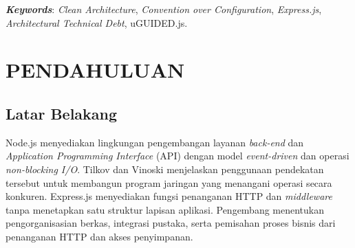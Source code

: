 \documentclass[12pt,a4paper,oneside]{report}
\begin{document}
\vspace{0.4cm}
\noindent\textbf{\textit{Keywords}}: \textit{Clean Architecture}, \textit{Convention over Configuration}, \textit{Express.js}, \textit{Architectural Technical Debt}, uGUIDED.js.

\newpage

{
  \singlespacing
  \setlength{\parskip}{0pt}
  \tableofcontents
}
\newpage

{
  \singlespacing
  \setlength{\parskip}{0pt}
  \listoffigures
}
\newpage

{
  \singlespacing
  \setlength{\parskip}{0pt}
  \listoftables
}
\newpage

\setcounter{page}{1}

\chapter{PENDAHULUAN}
\label{chap:pendahuluan}

\section{Latar Belakang}
\label{sec:latar_belakang}

Node.js menyediakan lingkungan pengembangan layanan \textit{back-end} dan \textit{Application Programming Interface} (API) dengan model \textit{event-driven} dan operasi \textit{non-blocking I/O}. Tilkov dan Vinoski \cite{tilkov2010node} menjelaskan penggunaan pendekatan tersebut untuk membangun program jaringan yang menangani operasi secara konkuren. Express.js menyediakan fungsi penanganan HTTP dan \textit{middleware} tanpa menetapkan satu struktur lapisan aplikasi. Pengembang menentukan pengorganisasian berkas, integrasi pustaka, serta pemisahan proses bisnis dari penanganan HTTP dan akses penyimpanan.
\end{document}
